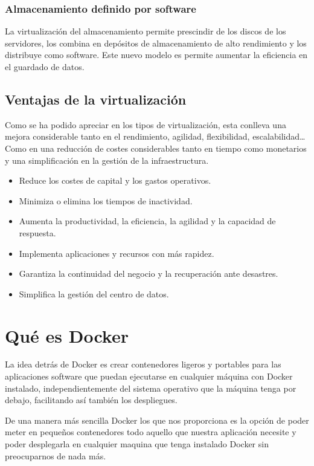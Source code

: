 \subsubsection{Almacenamiento definido por software}

La virtualización del almacenamiento permite prescindir de  los discos de los servidores, los combina en depósitos de almacenamiento de alto rendimiento y los distribuye como software. Este nuevo modelo es permite aumentar la eficiencia en el guardado de datos.
\pagebreak  

\subsection{Ventajas de la virtualización}

Como se ha podido apreciar en los tipos de virtualización, esta conlleva una mejora considerable tanto en el rendimiento, agilidad, flexibilidad, escalabilidad… Como en una reducción de costes considerables tanto en tiempo como monetarios y una simplificación en la gestión de la infraestructura.

\begin{itemize}
\item Reduce los costes de capital y los gastos operativos.
\item Minimiza o elimina los tiempos de inactividad.
\item Aumenta la productividad, la eficiencia, la agilidad y la capacidad de respuesta.
\item Implementa aplicaciones y recursos con más rapidez.
\item Garantiza la continuidad del negocio y la recuperación ante desastres.
\item Simplifica la gestión del centro de datos. 
\end{itemize}

\section{Qué es Docker}

La idea detrás de Docker es crear contenedores ligeros y portables para las aplicaciones software que puedan ejecutarse en cualquier máquina con Docker instalado,
independientemente del sistema operativo que la máquina tenga por debajo, facilitando así también los despliegues.

De una manera más sencilla Docker los que nos proporciona es la opción de poder meter en pequeños contenedores todo aquello que nuestra aplicación necesite y poder desplegarla en cualquier maquina que tenga instalado Docker sin preocuparnos de nada más. 

